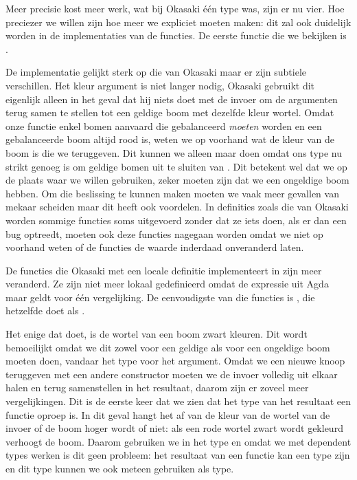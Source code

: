 
Meer precisie kost meer werk, wat bij Okasaki één type was, zijn er nu vier.
Hoe preciezer we willen zijn hoe meer we expliciet moeten maken: dit zal ook
duidelijk worden in de implementaties van de functies. De eerste functie die we
bekijken is .


De implementatie gelijkt sterk op die van Okasaki maar er zijn subtiele
verschillen. Het kleur argument is niet langer nodig, Okasaki gebruikt dit
eigenlijk alleen in het geval dat hij niets doet met de invoer om de argumenten
terug samen te stellen tot een geldige boom met dezelfde kleur wortel. Omdat
onze functie enkel bomen aanvaard die gebalanceerd \emph{moeten} worden en een
gebalanceerde boom altijd rood is, weten we op voorhand wat de kleur van de
boom is die we teruggeven. Dit kunnen we alleen maar doen omdat ons type nu
strikt genoeg is om geldige bomen uit te sluiten van . Dit
betekent wel dat we op de plaats waar we  willen gebruiken,
zeker moeten zijn dat we een ongeldige boom hebben. Om die beslissing te kunnen
maken moeten we vaak meer gevallen van mekaar scheiden maar dit heeft ook
voordelen. In definities zoals die van Okasaki worden sommige functies soms
uitgevoerd zonder dat ze iets doen, als er dan een bug optreedt, moeten ook
deze functies nagegaan worden omdat we niet op voorhand weten of de functies de
waarde inderdaad onveranderd laten.

De functies die Okasaki met een locale definitie implementeert in
 zijn meer veranderd. Ze zijn niet meer lokaal gedefinieerd omdat
de  expressie uit Agda maar geldt voor één vergelijking. De
eenvoudigste van die functies is , die hetzelfde doet als
.


Het enige dat  doet, is de wortel van een boom zwart kleuren.
Dit wordt bemoeilijkt omdat we dit zowel voor een geldige als voor een
ongeldige boom moeten doen, vandaar het type  voor het argument.
Omdat we een nieuwe knoop teruggeven met een andere constructor moeten we de
invoer volledig uit elkaar halen en terug samenstellen in het resultaat, daarom
zijn er zoveel meer vergelijkingen. Dit is de eerste keer dat we zien dat het
type van het resultaat een functie oproep is. In dit geval hangt het af van de
kleur van de wortel van de invoer of de boom hoger wordt of niet: als een rode
wortel zwart wordt gekleurd verhoogt de boom. Daarom gebruiken we
 in het type en omdat we met dependent types werken is dit
geen probleem: het resultaat van een functie kan een type zijn en dit type
kunnen we ook meteen gebruiken als type.

